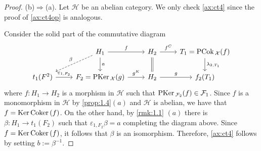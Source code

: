 \begin{proof}
\bigskip\bigskip\bigskip\bigskip\noindent
(b)$\Rightarrow$(a). Let $\mathcal{H}$ be an abelian category. We only check \ref{ax:ct4}  since the proof of \ref{ax:ct4op} is analogous.

Consider the solid part of the commutative diagram
\begin{equation*}
\begin{tikzcd}
 & H_1\arrow{r}{f}\arrow{d}{a}\arrow[dashed]{dl}[']{\beta} & H_2\arrow{r}{f^C}\arrow[equal]{d} & T_1=\PCok_\mathcal{X}(f)\arrow{d}{\lambda_{2,T_1}}\\
t_1(F^2)\arrow{r}{\varepsilon_{1,F_2}} & F_2=\PKer_\mathcal{X}(g)\arrow{r}{g^K} & H_2\arrow{r}{g} &f_2(T_1)
\end{tikzcd}
\end{equation*}
where $f:H_1\to H_2$ is a morphism in $\mathcal{H}$ such that $\mathrm{\textup{PKer\,}}_{\mathcal{F}_2}(f)\in\mathcal{F}_1$. Since $f$ is a monomorphism in $\mathcal{H}$ by \ref{prop:1.4}$(a)$  and $\mathcal{H}$ is abelian, we have that $f=\mathrm{\textup{Ker\,}} \mathrm{\textup{Coker\,}} (f)$. On the other hand, by \ref{rmk:1.1} $(a)$ there is $\beta:H_1\to t_1(F_2)$ such that $\varepsilon_{1,F_2}\beta = a$ completing the diagram above. Since $f=\mathrm{\textup{Ker\,}} \mathrm{\textup{Coker\,}}(f)$, it follows that $\beta$ is an isomorphism. Therefore, \ref{ax:ct4} follows by setting $b:=\beta^{-1}$.
\end{proof}





